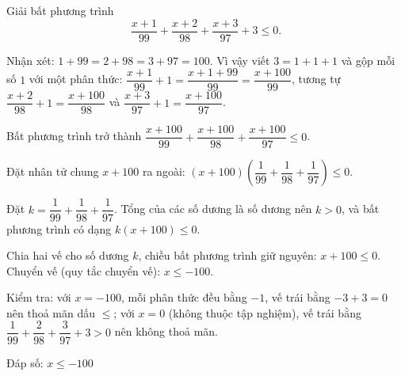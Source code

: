 \begin{problem}[9DS-BPT-051]
Giải bất phương trình
\[ \dfrac{x + 1}{99} + \dfrac{x + 2}{98} + \dfrac{x + 3}{97} + 3 \leq 0. \]

\begin{solution}
Nhận xét: $1 + 99 = 2 + 98 = 3 + 97 = 100$. Vì vậy viết $3 = 1 + 1 + 1$ và gộp mỗi số $1$ với một phân thức: $\dfrac{x + 1}{99} + 1 = \dfrac{x + 1 + 99}{99} = \dfrac{x + 100}{99}$, tương tự $\dfrac{x + 2}{98} + 1 = \dfrac{x + 100}{98}$ và $\dfrac{x + 3}{97} + 1 = \dfrac{x + 100}{97}$.

Bất phương trình trở thành $\dfrac{x + 100}{99} + \dfrac{x + 100}{98} + \dfrac{x + 100}{97} \leq 0$.

Đặt nhân tử chung $x + 100$ ra ngoài: $(x + 100)\left(\dfrac{1}{99} + \dfrac{1}{98} + \dfrac{1}{97}\right) \leq 0$.

Đặt $k = \dfrac{1}{99} + \dfrac{1}{98} + \dfrac{1}{97}$. Tổng của các số dương là số dương nên $k > 0$, và bất phương trình có dạng $k(x + 100) \leq 0$.

Chia hai vế cho số dương $k$, chiều bất phương trình giữ nguyên: $x + 100 \leq 0$. Chuyển vế (quy tắc chuyển vế): $x \leq -100$.

Kiểm tra: với $x = -100$, mỗi phân thức đều bằng $-1$, vế trái bằng $-3 + 3 = 0$ nên thoả mãn dấu $\leq$; với $x = 0$ (không thuộc tập nghiệm), vế trái bằng $\dfrac{1}{99} + \dfrac{2}{98} + \dfrac{3}{97} + 3 > 0$ nên không thoả mãn.

Đáp số: $\boxed{x \leq -100}$
\end{solution}
\end{problem}


